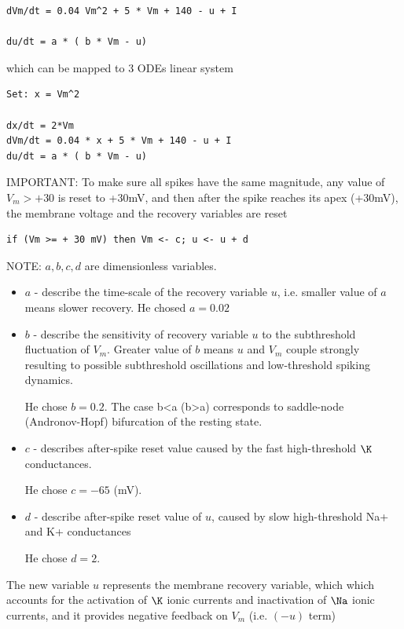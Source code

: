\begin{verbatim}
dVm/dt = 0.04 Vm^2 + 5 * Vm + 140 - u + I

du/dt = a * ( b * Vm - u) 
\end{verbatim}

which can be mapped to 3 ODEs linear system
\begin{verbatim}
Set: x = Vm^2

dx/dt = 2*Vm
dVm/dt = 0.04 * x + 5 * Vm + 140 - u + I
du/dt = a * ( b * Vm - u) 
\end{verbatim}

IMPORTANT: To make sure all spikes have the same magnitude, any value of $V_m > +30$ is
reset to +30mV, and then after the spike reaches its apex (+30mV), the membrane
voltage and the recovery variables are reset

\begin{verbatim}
if (Vm >= + 30 mV) then Vm <- c; u <- u + d
\end{verbatim}

NOTE: $a,b,c,d$ are dimensionless variables.
\begin{itemize}
  \item $a$ - describe the time-scale of the recovery variable $u$, i.e. smaller
  value of $a$ means slower recovery. He chosed $a=0.02$
  
  \item $b$ - describe the sensitivity of recovery variable $u$ to the
  subthreshold fluctuation of $V_m$. Greater value of $b$ means $u$ and $V_m$
  couple strongly resulting to possible subthreshold oscillations and
  low-threshold spiking dynamics.
  
He chose $b=0.2$.  The case b<a (b>a) corresponds to saddle-node (Andronov-Hopf)
bifurcation of the resting state.

  \item  $c$ - describes after-spike reset value caused by the fast
  high-threshold $\K$ conductances. 
  
  He chose $c = -65$ (mV).
  
  \item $d$ - describe after-spike reset value of $u$, caused by slow
  high-threshold Na+ and K+ conductances
  
  He chose $d=2$.
\end{itemize}

The new variable $u$ represents the membrane recovery variable, which which
accounts for the activation of $\K$ ionic currents and inactivation of $\Na$
ionic currents, and it provides negative feedback on $V_m$ (i.e. $(-u)$ term)

